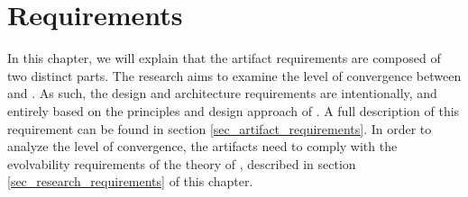 \chapter{Requirements} \label{chap_requirements} 

In this chapter, we will explain that the artifact requirements are composed of two
distinct parts. The research aims to examine the level of convergence between \ca and
\ns. As such, the design and architecture requirements are intentionally, and entirely 
based on the principles and design approach of \ca. A full description of this requirement
can be found in section \ref{sec_artifact_requirements}. In order to analyze the level of
convergence, the artifacts need to comply with the evolvability requirements of the theory
of \ns, described in section \ref{sec_research_requirements} of this chapter.


